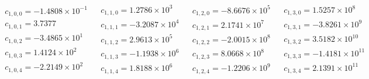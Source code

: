 \documentclass[prd,aps,twocolumn,nofootinbib,showpacs,superscriptaddress]{revtex4-1}
\begin{document}
\[\begin{array}{cccc}
\begin{array}{c}
 c_{1,0,0}=-1.4808\times 10^{-1} \\
 c_{1,0,1}=3.7377 \\
 c_{1,0,2}=-3.4865\times 10^1 \\
 c_{1,0,3}=1.4124\times 10^2 \\
 c_{1,0,4}=-2.2149\times 10^2 \\
\end{array}
 & 
\begin{array}{c}
 c_{1,1,0}=1.2786\times 10^3 \\
 c_{1,1,1}=-3.2087\times 10^4 \\
 c_{1,1,2}=2.9613\times 10^5 \\
 c_{1,1,3}=-1.1938\times 10^6 \\
 c_{1,1,4}=1.8188\times 10^6 \\
\end{array}
 & 
\begin{array}{c}
 c_{1,2,0}=-8.6676\times 10^5 \\
 c_{1,2,1}=2.1741\times 10^7 \\
 c_{1,2,2}=-2.0015\times 10^8 \\
 c_{1,2,3}=8.0668\times 10^8 \\
 c_{1,2,4}=-1.2206\times 10^9 \\
\end{array}
 & 
\begin{array}{c}
 c_{1,3,0}=1.5257\times 10^8 \\
 c_{1,3,1}=-3.8261\times 10^9 \\
 c_{1,3,2}=3.5182\times 10^{10} \\
 c_{1,3,3}=-1.4181\times 10^{11} \\
 c_{1,3,4}=2.1391\times 10^{11} \\
\end{array}
 \\
 

\end{array}\]
\end{document}
